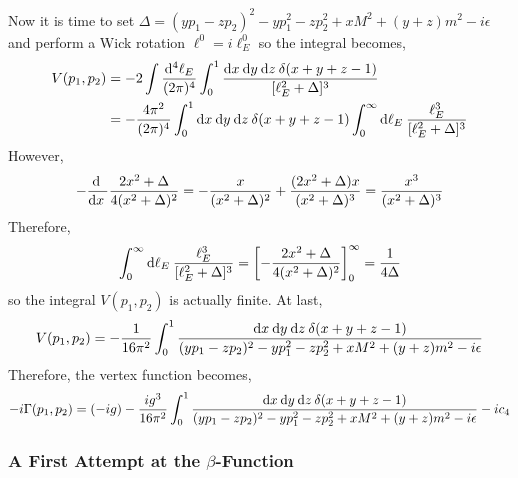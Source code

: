 \documentclass[12pt]{article}
\begin{document}
Now it is time to set $\Delta = (y p_1 - z p_2)^2 - y p_1^2 - z p_2^2 + x M^2 + (y + z) m^2 - i \epsilon$ and perform a Wick rotation $\ell^0 = i \ell_E^0$ so the integral becomes,
\begin{align*}
V(p_1, p_2) & = -2 \int \frac{\mathrm{d}^4 \ell_E}{(2 \pi)^4} \int_0^1 \frac{\mathrm{d}x \: \mathrm{d}y \: \mathrm{d}z \: \delta(x + y + z - 1)}{[\ell_E^2 + \Delta]^3}
\\
& = - \frac{4 \pi^2}{(2 \pi)^4} \int_0^1 \mathrm{d}x \: \mathrm{d}y \: \mathrm{d}z \: \delta(x + y + z - 1) \int_{0}^\infty \mathrm{d}\ell_E \: \frac{\ell_E^3}{[\ell_E^2 + \Delta]^3}
\end{align*}
However, 
\[ - \frac{\mathrm{d} \:}{\mathrm{d}x \:} \frac{2 x^2 + \Delta}{4(x^2 + \Delta)^2} = -\frac{x}{(x^2 + \Delta)^2} + \frac{(2 x^2 + \Delta)x}{(x^2 + \Delta)^3} = \frac{x^3}{(x^2 + \Delta)^3}\]
Therefore, 
\[ \int_{0}^\infty \mathrm{d}\ell_E \: \frac{\ell_E^3}{[\ell_E^2 + \Delta]^3} = \left[ -\frac{2 x^2 + \Delta}{4(x^2 + \Delta)^2} \right]_{0}^\infty = \frac{1}{4 \Delta} \]
so the integral $V(p_1, p_2)$ is actually finite. At last,
\[ V(p_1, p_2) = -\frac{1}{16 \pi^2} \int_0^1 \frac{\mathrm{d}x \: \mathrm{d}y \: \mathrm{d}z \: \delta(x + y + z - 1) }{(y p_1 - z p_2)^2 - y p_1^2 - z p_2^2 + x M^2 + (y + z) m^2 - i \epsilon} \]
Therefore, the vertex function becomes,
\[ - i \Gamma(p_1, p_2) = (-ig) - \frac{ig^3}{16 \pi^2} \int_0^1 \frac{\mathrm{d}x \: \mathrm{d}y \: \mathrm{d}z \: \delta(x + y + z - 1) }{(y p_1 - z p_2)^2 - y p_1^2 - z p_2^2 + x M^2 + (y + z) m^2 - i \epsilon} - i c_4\]

\subsubsection{A First Attempt at the $\beta$-Function}
\end{document}
